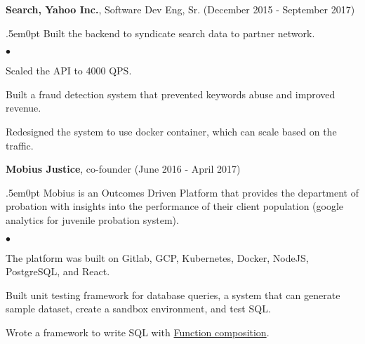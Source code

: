 \documentclass[margin, line, 10pt]{res}
\newenvironment{list2}{
  \begin{list}{$\bullet$}{%
      \setlength{\itemsep}{0in}
      \setlength{\parsep}{0in} \setlength{\parskip}{0in}
      \setlength{\topsep}{0in} \setlength{\partopsep}{0in}
      \setlength{\leftmargin}{0.2in}}}{\end{list}}
\begin{document}
\begin{resume}
{\Large {\bf Search, Yahoo Inc.}}, Software Dev Eng, Sr. \hfill (December 2015 - September 2017)\\
\begin{adjustwidth}{.5em}{0pt}
  \vspace{-.3cm}
  Built the backend to syndicate search data to partner network.
  \begin{list2}
  \vspace{.2cm}
  \item Scaled the API to 4000 QPS.
  \item Built a fraud detection system that prevented keywords abuse and improved revenue.
  \item Redesigned the system to use docker container, which can scale based on the traffic.
  \end{list2}
  \vspace{.05cm}
\end{adjustwidth}

\vspace{.05cm}

{\Large {\bf Mobius Justice}}, co-founder \hfill (June 2016 - April 2017)\\
\begin{adjustwidth}{.5em}{0pt}
  \vspace{-.3cm}
  Mobius is an Outcomes Driven Platform that provides the department of probation with insights
into the performance of their client population (google analytics for juvenile probation system).

  \begin{list2}
  \vspace{.2cm}
  \item The platform was built on Gitlab, GCP, Kubernetes, Docker, NodeJS, PostgreSQL, and React.
  \item Built unit testing framework for database queries, a system that can generate sample dataset, create a sandbox environment, and test SQL.
  \item Wrote a framework to write SQL with \href{https://en.wikipedia.org/wiki/Function_composition_(computer_science)}{Function composition}.
  \end{list2}
  \vspace{.05cm}
\end{adjustwidth}



\end{resume}
\end{document}
